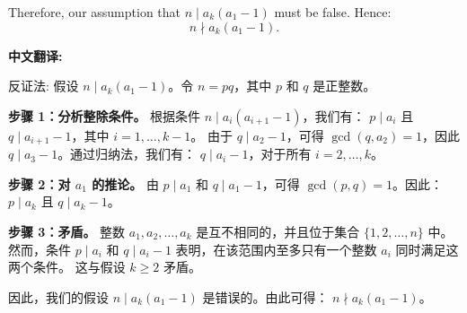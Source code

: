 \documentclass[a4paper]{article}
\begin{document}
    Therefore, our assumption that $n \mid a_k(a_1-1)$ must be false. Hence:
    \[n \nmid a_k(a_1-1).\]

    \[\]
    \textbf{中文翻译:}

    反证法: 假设 $n \mid a_k(a_1-1)$。令 $n = pq$，其中 $p$ 和 $q$ 是正整数。

    \textbf{步骤 1：分析整除条件。}  
    根据条件 $n \mid a_i(a_{i+1}-1)$，我们有：
    $p \mid a_i$ 且 $q \mid a_{i+1}-1$，其中 $i = 1, \ldots, k-1$。
    由于 $q \mid a_2-1$，可得 $\gcd(q, a_2) = 1$，因此 $q \mid a_3-1$。通过归纳法，我们有：
    $q \mid a_i-1$，对于所有 $i = 2, \ldots, k$。

    \textbf{步骤 2：对 $a_1$ 的推论。}  
    由 $p \mid a_1$ 和 $q \mid a_1-1$，可得 $\gcd(p, q) = 1$。因此：
    $p \mid a_k$ 且 $q \mid a_k-1$。

    \textbf{步骤 3：矛盾。}  
    整数 $a_1, a_2, \ldots, a_k$ 是互不相同的，并且位于集合 $\{1, 2, \ldots, n\}$ 中。
    然而，条件 $p \mid a_i$ 和 $q \mid a_i-1$ 表明，在该范围内至多只有一个整数 $a_i$ 同时满足这两个条件。
    这与假设 $k \geq 2$ 矛盾。

    因此，我们的假设 $n \mid a_k(a_1-1)$ 是错误的。由此可得：
    $n \nmid a_k(a_1-1)$。
\end{document}
